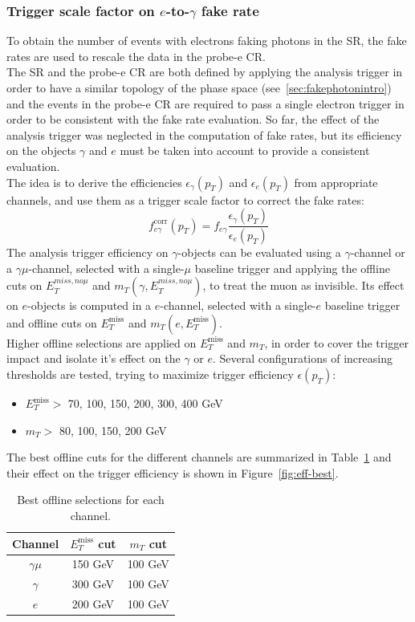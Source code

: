 \subsubsection{Trigger scale factor on $e$-to-$\gamma$ fake rate}
To obtain the number of events with electrons faking photons in the SR, the fake rates are used to rescale the data in the probe-e CR. \\
The SR and the probe-e CR are both defined by applying the analysis trigger in order to have a similar topology of the phase space (see~\ref{sec:fakephotonintro}) and the events in the probe-e CR are required to pass a single electron trigger in order to be consistent with the fake rate evaluation.
So far, the effect of the analysis trigger was neglected in the computation of fake rates, but its efficiency on the objects $\gamma$ and $e$ must be taken into account to provide a consistent evaluation. \\
The idea is to derive the efficiencies $\epsilon_{\gamma}(p_T)$ and $\epsilon_{e}(p_T)$ from appropriate channels, and use them as a trigger scale factor to correct the fake rates:
$$f_{e\gamma}^{\text{corr}}(p_T)=f_{e\gamma}\frac{\epsilon_{\gamma}(p_T)}{\epsilon_{e}(p_T)}$$
The analysis trigger efficiency on $\gamma$-objects can be evaluated using a $\gamma$-channel or a $\gamma \mu$-channel, selected with a single-$\mu$ baseline trigger and applying the offline cuts on $E_T^{miss, no \mu}$ and $ m_T(\gamma,E_T^{miss, no \mu})$, to treat the muon as invisible.
Its effect on $e$-objects is computed in a $e$-channel, selected with a single-$e$ baseline trigger and offline cuts on $E_T^{\text{miss}}$ and $ m_T(e,E_T^{\text{miss}})$. \\
Higher offline selections are applied on $E_T^{\text{miss}}$ and $m_T$, in order to cover the trigger impact and isolate it's effect on the $\gamma$ or $e$.
Several configurations of increasing thresholds are tested, trying to maximize trigger efficiency $\epsilon(p_T)$:
\begin{itemize}
     \item $E_T^{\text{miss}} > $ 70, 100, 150, 200, 300, 400 GeV
      \item $m_T > $ 80, 100, 150, 200 GeV
\end{itemize}
The best offline cuts for the different channels are summarized in Table~\ref{tab:eff-cuts} and their effect on the trigger efficiency is shown in Figure~\ref{fig:eff-best}.
\begin{table}[htbp]
  \centering
\begin{tabular}{|c|c|c|}
  \hline
  Channel & $E_T^{\text{miss}}$ cut & $m_T$ cut \\
  \hline
  $\gamma\mu$ & 150 GeV & 100 GeV \\
  $\gamma$   & 300 GeV & 100 GeV \\
  $e$        & 200 GeV & 100 GeV \\
  \hline
  \end{tabular}
  \caption{Best offline selections for each channel.}
  \label{tab:eff-cuts}
\end{table}

